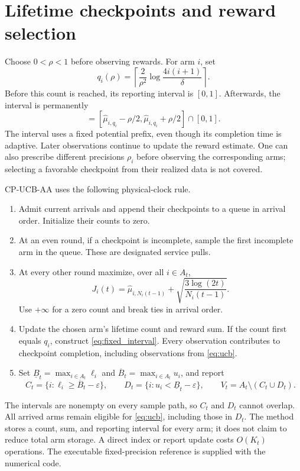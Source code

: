 \section{Lifetime checkpoints and reward selection}
\label{sec:method}

Choose $0<\rho<1$ before observing rewards. For arm $i$, set
\begin{equation}
 q_i(\rho)=\left\lceil\frac2{\rho^2}
                  \log\frac{4i(i+1)}\delta\right\rceil.
 \label{eq:checkpoint}
\end{equation}
Before this count is reached, its reporting interval is $[0,1]$. Afterwards,
the interval is permanently
\begin{equation}
 [\ell_i,u_i]=[\widehat\mu_{i,q_i}-\rho/2,
                 \widehat\mu_{i,q_i}+\rho/2]\cap[0,1].
 \label{eq:fixed_interval}
\end{equation}
The interval uses a fixed potential prefix, even though its completion time is
adaptive. Later observations continue to update the reward estimate. One can
also prescribe different precisions $\rho_i$ before observing the corresponding
arms; selecting a favorable checkpoint from their realized data is not covered.

CP-UCB-AA uses the following physical-clock rule.
\begin{enumerate}
\item Admit current arrivals and append their checkpoints to a queue in arrival
order. Initialize their counts to zero.
\item At an even round, if a checkpoint is incomplete, sample the first
incomplete arm in the queue. These are designated service pulls.
\item At every other round maximize, over all $i\in A_t$,
\begin{equation}
 J_i(t)=\widehat\mu_{i,N_i(t-1)}+
             \sqrt{\frac{3\log(2t)}{N_i(t-1)}}.
 \label{eq:ucb}
\end{equation}
Use $+\infty$ for a zero count and break ties in arrival order.
\item Update the chosen arm's lifetime count and reward sum. If the count first
equals $q_i$, construct \eqref{eq:fixed_interval}. Every observation contributes
to checkpoint completion, including observations from \eqref{eq:ucb}.
\item Set $\underline B_t=\max_{i\in A_t}\ell_i$ and
$\overline B_t=\max_{i\in A_t}u_i$, and report
\begin{equation}
 C_t=\{i:\ell_i\ge\overline B_t-\varepsilon\},\qquad
 D_t=\{i:u_i<\underline B_t-\varepsilon\},\qquad
 V_t=A_t\setminus(C_t\cup D_t).
 \label{eq:reports}
\end{equation}
\end{enumerate}
The intervals are nonempty on every sample path, so $C_t$ and $D_t$ cannot
overlap. All arrived arms remain eligible for \eqref{eq:ucb}, including those
in $D_t$. The method stores a count, sum, and reporting interval for every arm;
it does not claim to reduce total arm storage. A direct index or report update
costs $O(K_t)$ operations. The executable fixed-precision reference is supplied
with the numerical code.

